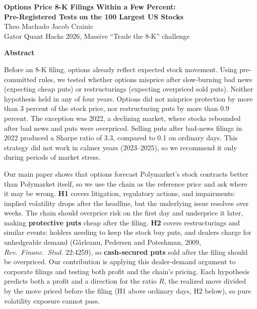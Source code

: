 \documentclass[11pt]{article}
\makeatletter
\renewcommand\section{\@startsection{section}{1}{\z@}{-1.2ex \@plus -.3ex \@minus -.2ex}{0.4ex}{\normalfont\normalsize\bfseries}}
\makeatother
\begin{document}
\begin{center}
{\large\bfseries Options Price 8-K Filings Within a Few Percent:\\ Pre-Registered Tests on the 100 Largest US Stocks}\\[0.6ex]
Theo Machado \quad Jacob Crainic\\
Gator Quant Hacks 2026, Massive ``Trade the 8-K'' challenge
\end{center}

\vspace{-0.6ex}
\begin{center}\textbf{Abstract}\end{center}
\vspace{-1.4ex}
{\small Before an 8-K filing, options already reflect expected stock movement. Using pre-committed rules, we tested whether options misprice after slow-burning bad news (expecting cheap puts) or restructurings (expecting overpriced sold puts). Neither hypothesis held in any of four years. Options did not misprice protection by more than 3 percent of the stock price, nor restructuring puts by more than 0.9 percent. The exception was 2022, a declining market, where stocks rebounded after bad news and puts were overpriced. Selling puts after bad-news filings in 2022 produced a Sharpe ratio of 3.3, compared to 0.1 on ordinary days. This strategy did not work in calmer years (2023--2025), so we recommend it only during periods of market stress.}

\section{Hypothesis}
Our main paper shows that options forecast Polymarket's stock contracts better than Polymarket itself, so we use the chain as the reference price and ask where it may be wrong. \textbf{H1} covers litigation, regulatory actions, and impairments: implied volatility drops after the headline, but the underlying issue resolves over weeks. The chain should overprice risk on the first day and underprice it later, making \textbf{protective puts} cheap after the filing. \textbf{H2} covers restructurings and similar events: holders needing to keep the stock buy puts, and dealers charge for unhedgeable demand (Gârleanu, Pedersen and Poteshman, 2009, \emph{Rev.\ Financ.\ Stud.} 22:4259), so \textbf{cash-secured puts} sold after the filing should be overpriced. Our contribution is applying this dealer-demand argument to corporate filings and testing both profit and the chain's pricing. Each hypothesis predicts both a profit and a direction for the ratio $R$, the realized move divided by the move priced before the filing (H1 above ordinary days, H2 below), so pure volatility exposure cannot pass.
\end{document}
